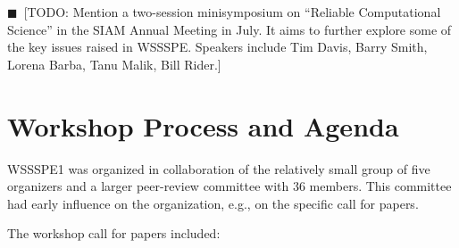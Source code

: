 \documentclass[11pt, oneside]{amsart}
\newcommand{\todo}[1]{{\color{blue}$\blacksquare$~\textsf{[TODO: #1]}}}
\begin{document}
\todo{Mention a two-session minisymposium on ``Reliable Computational Science'' in the SIAM Annual Meeting in July. It aims to further explore some of the key issues raised in WSSSPE. Speakers include Tim Davis, Barry Smith, Lorena Barba, Tanu Malik, Bill Rider.}

\section{Workshop Process and Agenda} \label{sec:process}

WSSSPE1 was organized in collaboration of the relatively small group of five organizers and
a larger peer-review committee with 36 members. This committee had early influence on the organization,
e.g., on the specific call for papers.

The workshop call for papers included:
\end{document}
